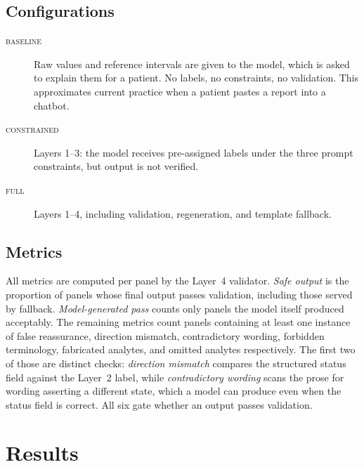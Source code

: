 \documentclass{svproc}
\begin{document}
\subsection{Configurations}

\begin{description}
\item[\textsc{baseline}] Raw values and reference intervals are given to
the model, which is asked to explain them for a patient. No labels, no
constraints, no validation. This approximates current practice when a
patient pastes a report into a chatbot.
\item[\textsc{constrained}] Layers 1--3: the model receives pre-assigned
labels under the three prompt constraints, but output is not verified.
\item[\textsc{full}] Layers 1--4, including validation, regeneration, and
template fallback.
\end{description}

\subsection{Metrics}

All metrics are computed per panel by the Layer~4 validator.
\emph{Safe output} is the proportion of panels whose final output passes
validation, including those served by fallback. \emph{Model-generated
pass} counts only panels the model itself produced acceptably. The
remaining metrics count panels containing at least one instance of false
reassurance, direction mismatch, contradictory wording, forbidden
terminology, fabricated analytes, and omitted analytes respectively. The
first two of those are distinct checks: \emph{direction mismatch}
compares the structured status field against the Layer~2 label, while
\emph{contradictory wording} scans the prose for wording asserting a
different state, which a model can produce even when the status field is
correct. All six gate whether an output passes validation.


\section{Results}
\end{document}
